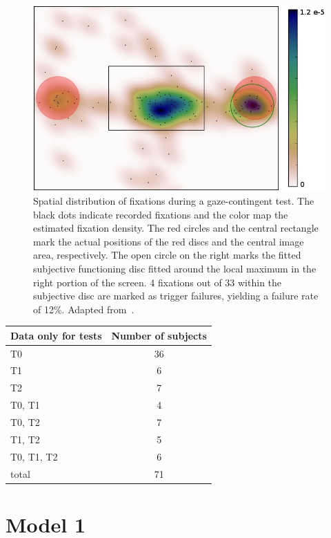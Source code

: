 \documentclass[a4paper]{scrreprt}
\begin{document}
\begin{figure}
\centering
\includegraphics[width=0.8\linewidth]{figs/6m5_1_2.jpg}
\caption{Spatial distribution of fixations during a gaze-contingent test. The black dots indicate recorded fixations and the color map the estimated fixation density. The red circles and the central rectangle mark the actual positions of the red discs and the central image area, respectively. The open circle on the right marks the fitted subjective functioning disc fitted around the local maximum in the right portion of the screen. 4 fixations out of 33 within the subjective disc are marked as trigger failures, yielding a failure rate of 12\%. Adapted from~\cite{kolling17}.}
\label{fig:fix_density}
\end{figure}


\begin{center}
\begin{tabular}{ l  c }
\hline
Data only for tests & Number of subjects\\
\hline
T0 & 36 \\
T1 & 6 \\
T2 & 7 \\
T0, T1 & 4 \\ 
T0, T2 & 7 \\
T1, T2 & 5 \\ 
T0, T1, T2 & 6 \\
\hline
total & 71\\
\hline
\end{tabular}
\label{tab:filtered_groups}
\end{center}

\clearpage

\section{Model 1}
\label{sec:met_model1}
\end{document}
